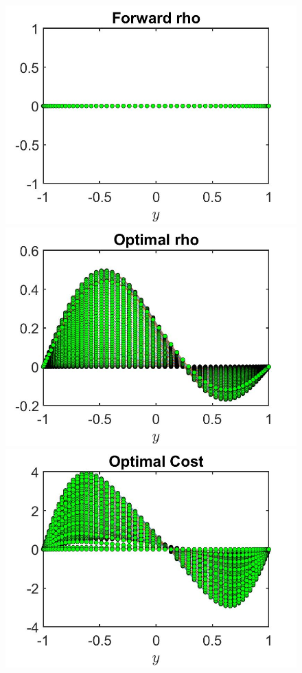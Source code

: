 \documentclass[11pt, a4paper]{article}
\theoremstyle{definition}
\begin{document}
\begin{figure}[h]
	\includegraphics[scale=0.3]{DFrhoFW1.jpg}	
	\includegraphics[scale=0.3]{DFrhoOpt1.jpg}
	\includegraphics[scale=0.3]{DFwOpt1.jpg}

\end{figure}
\end{document}
